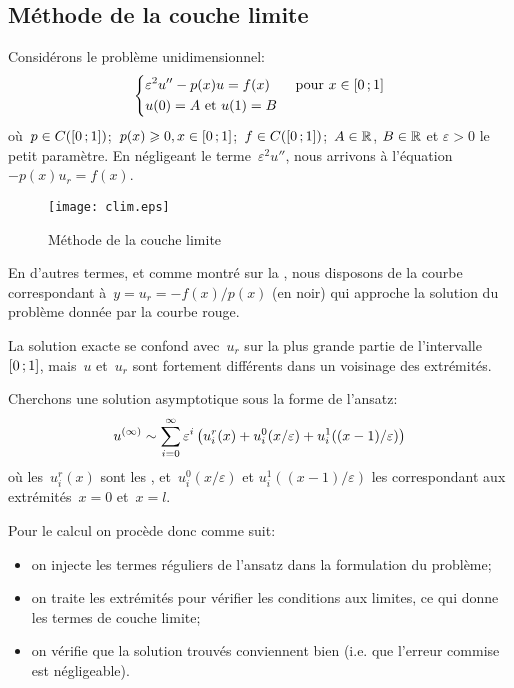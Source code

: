 \medskip
\subsection{Méthode de la couche limite}

Considérons le problème unidimensionnel:
\begin{equation}
\left\{
\begin{aligned}
&\varepsilon^2u''-p(x)u= f(x) &&\text{ pour } x\in\mathopen{[}0\,;1\mathclose{]}\\
&u(0)=A \text{ et } u(1)=B
\end{aligned}
\right.
\end{equation}
où~$p\in C(\mathopen{[}0\,;1\mathclose{]})$;~$p(x)\geqslant0, x\in\mathopen{[}0\,;1\mathclose{]}$;~$f\in C(\mathopen{[}0\,;1\mathclose{]})$;~$A\in\mathbb R$, $B\in\mathbb R$ et
$\varepsilon>0$ le petit paramètre.
En négligeant le terme~$\varepsilon^2 u''$, nous arrivons à l'équation~$-p(x)u_r=f(x)$.
\begin{figure}[ht]
\centering\texttt{[image: clim.eps]}
\caption{Méthode de la couche limite}\label{Fig-clim}
\end{figure}
En d'autres termes, et comme montré sur la , nous disposons de la courbe correspondant à~$y=u_r=-f(x)/p(x)$ (en noir) qui approche la solution du problème donnée par la courbe rouge.

La solution exacte se confond avec~$u_r$ sur la plus grande partie de l'intervalle~$\mathopen{[}0\,;1\mathclose{]}$,
mais~$u$ et~$u_r$ sont fortement différents dans un voisinage des extrémités.

\medskip
Cherchons une solution asymptotique sous la forme de l'ansatz:
\begin{equation}
u^{(\infty)} \sim \displaystyle\sum_{i=0}^\infty \varepsilon^i\left( u_i^r(x) + u_i^0(x/\varepsilon)
+u_i^1((x-1)/\varepsilon) \right)
\end{equation}
où les~$u_i^r(x)$ sont les , et~$u_i^0(x/\varepsilon)$ et
$u_i^1((x-1)/\varepsilon)$ les  correspondant aux
extrémités~$x=0$ et~$x=l$.

\medskip
Pour le calcul on procède donc comme suit:
\begin{itemize}
  \item on injecte les termes réguliers de l'ansatz dans la formulation du problème;
  \item on traite les extrémités pour vérifier les conditions aux limites, ce qui donne les termes de couche
	limite;
  \item on vérifie que la solution trouvés conviennent bien (i.e. que l'erreur commise est négligeable).
\end{itemize}


